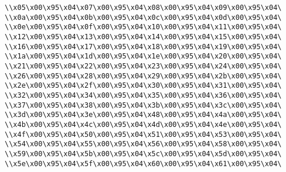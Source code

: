 \verb|\\x05\x00\x95\x04\x07\x00\x95\x04\x08\x00\x95\x04\x09\x00\x95\x04\|\newline
\verb|\\x0a\x00\x95\x04\x0b\x00\x95\x04\x0c\x00\x95\x04\x0d\x00\x95\x04\|\newline
\verb|\\x0e\x00\x95\x04\x0f\x00\x95\x04\x10\x00\x95\x04\x11\x00\x95\x04\|\newline
\verb|\\x12\x00\x95\x04\x13\x00\x95\x04\x14\x00\x95\x04\x15\x00\x95\x04\|\newline
\verb|\\x16\x00\x95\x04\x17\x00\x95\x04\x18\x00\x95\x04\x19\x00\x95\x04\|\newline
\verb|\\x1a\x00\x95\x04\x1d\x00\x95\x04\x1e\x00\x95\x04\x20\x00\x95\x04\|\newline
\verb|\\x21\x00\x95\x04\x22\x00\x95\x04\x23\x00\x95\x04\x24\x00\x95\x04\|\newline
\verb|\\x26\x00\x95\x04\x28\x00\x95\x04\x29\x00\x95\x04\x2b\x00\x95\x04\|\newline
\verb|\\x2e\x00\x95\x04\x2f\x00\x95\x04\x30\x00\x95\x04\x31\x00\x95\x04\|\newline
\verb|\\x32\x00\x95\x04\x34\x00\x95\x04\x35\x00\x95\x04\x36\x00\x95\x04\|\newline
\verb|\\x37\x00\x95\x04\x38\x00\x95\x04\x3b\x00\x95\x04\x3c\x00\x95\x04\|\newline
\verb|\\x3d\x00\x95\x04\x3e\x00\x95\x04\x48\x00\x95\x04\x4a\x00\x95\x04\|\newline
\verb|\\x4b\x00\x95\x04\x4c\x00\x95\x04\x4d\x00\x95\x04\x4e\x00\x95\x04\|\newline
\verb|\\x4f\x00\x95\x04\x50\x00\x95\x04\x51\x00\x95\x04\x53\x00\x95\x04\|\newline
\verb|\\x54\x00\x95\x04\x55\x00\x95\x04\x56\x00\x95\x04\x58\x00\x95\x04\|\newline
\verb|\\x59\x00\x95\x04\x5b\x00\x95\x04\x5c\x00\x95\x04\x5d\x00\x95\x04\|\newline
\verb|\\x5e\x00\x95\x04\x5f\x00\x95\x04\x60\x00\x95\x04\x61\x00\x95\x04\|\newline
